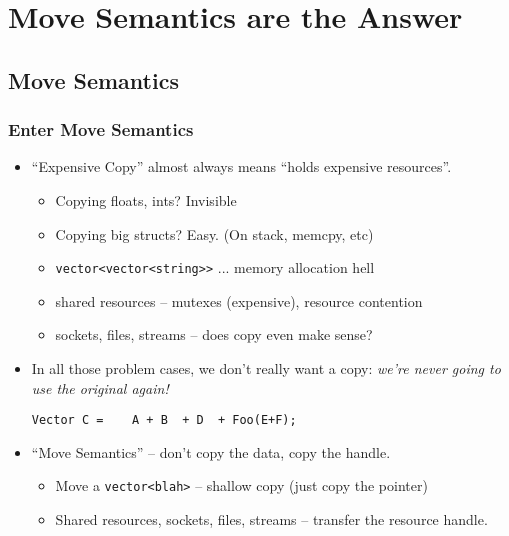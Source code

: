 
\lyxframeend{}\section[The Solution]{Move Semantics are the Answer}

\subsection[Move Semantics]{Move Semantics}\lyxframeend{}


\begin{frame}[fragile]
\frametitle{Enter Move Semantics}

\begin{itemize}[<+->]
\item ``Expensive Copy'' almost always means ``holds expensive resources''.

      \begin{itemize}[<+->]
      \item Copying floats, ints? Invisible
      \item Copying big structs? Easy.  (On stack, memcpy, etc)
      \item \texttt{vector<vector<string>{}>}  ...  memory allocation hell
      \item shared resources -- mutexes (expensive), resource contention
      \item sockets, files, streams -- does copy even make sense?
      \end{itemize}

\vskip 6pt
\pause

\item In all those problem cases, we don't really want a copy: \emph{we're never going to
  use the original again!}
\begin{verbatim}
Vector C =    A + B  + D  + Foo(E+F);
\end{verbatim}


\vskip 6pt
\pause

\item ``Move Semantics'' -- don't copy the data, copy the handle.

    \begin{itemize}[<+->]
    \item Move a \texttt{vector<blah>} -- shallow copy (just copy the pointer)
    \item Shared resources, sockets, files, streams -- transfer the
    resource handle.

    \end{itemize}


\end{itemize}
\end{frame}


